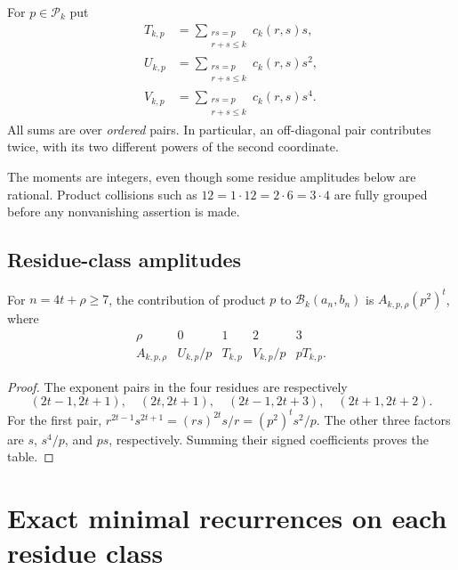 \documentclass[11pt,a4paper]{article}
\numberwithin{equation}{section}
\theoremstyle{definition}
\theoremstyle{remark}
\newcommand{\Bip}{\mathcal B}
\begin{document}
\begin{definition}\label{sc:def:moments}
For $p\in\mathcal P_k$ put
\begin{align}
 T_{k,p}&=\sum_{\substack{rs=p\\r+s\le k}}c_k(r,s)s,\label{sc:eq:T}\\
 U_{k,p}&=\sum_{\substack{rs=p\\r+s\le k}}c_k(r,s)s^2,\label{sc:eq:U}\\
 V_{k,p}&=\sum_{\substack{rs=p\\r+s\le k}}c_k(r,s)s^4.\label{sc:eq:V}
\end{align}
All sums are over \emph{ordered} pairs. In particular, an off-diagonal pair
contributes twice, with its two different powers of the second coordinate.
\end{definition}

The moments are integers, even though some residue amplitudes below are
rational. Product collisions such as $12=1\cdot12=2\cdot6=3\cdot4$ are
fully grouped before any nonvanishing assertion is made.

\subsection{Residue-class amplitudes}
\begin{lemma}\label{sc:lem:residueexpansion}
For $n=4t+\rho\ge7$, the contribution of product $p$ to
$\Bip_k(a_n,b_n)$ is $A_{k,p,\rho}(p^2)^t$, where
\begin{equation}\label{sc:eq:amplitudes}
\begin{array}{c|cccc}
\rho&0&1&2&3\\\hline
A_{k,p,\rho}&U_{k,p}/p&T_{k,p}&V_{k,p}/p&pT_{k,p}.
\end{array}
\end{equation}
\end{lemma}
\begin{proof}
The exponent pairs in the four residues are respectively
\[
(2t-1,2t+1),\quad(2t,2t+1),\quad
(2t-1,2t+3),\quad(2t+1,2t+2).
\]
For the first pair,
$r^{2t-1}s^{2t+1}=(rs)^{2t}s/r=(p^2)^t s^2/p$.
The other three factors are $s$, $s^4/p$, and $ps$, respectively.
Summing their signed coefficients proves the table.
\end{proof}

\section{Exact minimal recurrences on each residue class}\label{sc:sec:residue}
\end{document}
